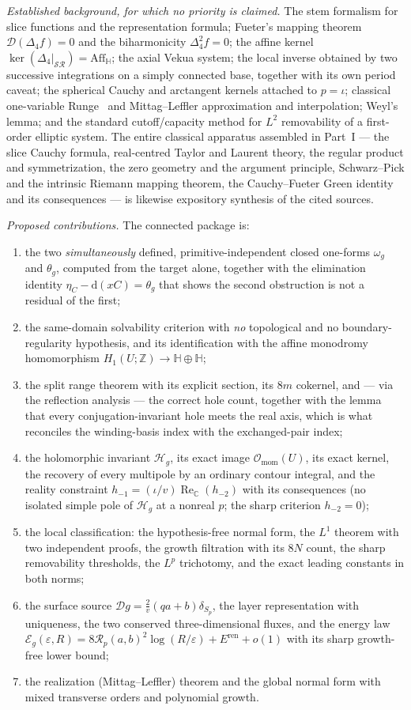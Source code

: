 \documentclass[11pt,a4paper]{article}
\numberwithin{equation}{section}
\theoremstyle{definition}
\theoremstyle{remark}
\theoremstyle{plain}
\newcommand{\HH}{\mathbb H}
\newcommand{\CC}{\mathbb C}
\newcommand{\ZZ}{\mathbb Z}
\DeclareMathOperator{\Rea}{Re}
\newcommand{\ReC}{\Rea_{\CC}}
\newcommand{\Dop}{\mathcal D}
\newcommand{\lap}{\Delta_4}
\newcommand{\SR}{\mathcal{SR}}
\newcommand{\Aff}{\mathrm{Aff}_{\HH}}
\newcommand{\Omom}{\mathcal O_{\mathrm{mom}}}
\newcommand{\om}{\omega}
\newcommand{\thet}{\theta}
\newcommand{\etaC}{\eta_{C}}
\newcommand{\pot}{C}          %
\newcommand{\Sp}{S_{p}}
\newcommand{\Rp}{\mathcal R_{p}}      %
\newcommand{\Hg}{\mathcal H_{g}}      %
\newcommand{\Eg}{\mathcal E_{g}}
\newcommand{\Eren}{E^{\mathrm{ren}}}
\newcommand{\dd}{\mathrm d}
\begin{document}
\emph{Established background, for which no priority is claimed.}
The stem formalism for slice functions and the representation formula;
Fueter's mapping theorem $\Dop(\lap f)=0$ and the biharmonicity
$\lap^2f=0$; the affine kernel $\ker(\lap|_{\SR})=\Aff$; the axial Vekua
system; the local inverse obtained by two successive integrations on a
simply connected base, together with its own period caveat; the spherical
Cauchy and arctangent kernels attached to $p=\iota$; classical one-variable
Runge~\cite{Runge} and Mittag--Leffler approximation and interpolation; Weyl's lemma;
and the standard cutoff/capacity method for $L^2$ removability of a
first-order elliptic system. The entire classical apparatus assembled in
Part~I --- the slice Cauchy formula, real-centred Taylor and Laurent
theory, the regular product and symmetrization, the zero geometry and the
argument principle, Schwarz--Pick and the intrinsic Riemann mapping
theorem, the Cauchy--Fueter Green identity and its consequences --- is
likewise expository synthesis of the cited sources.

\emph{Proposed contributions.} The connected package is:
\begin{enumerate}[label=\textup{(\alph*)}]
\item the two \emph{simultaneously} defined, primitive-independent closed
one-forms $\om_g$ and $\thet_g$, computed from the target alone, together
with the elimination identity $\etaC-\dd(x\pot)=\thet_g$ that shows the
second obstruction is not a residual of the first;
\item the same-domain solvability criterion with \emph{no} topological and
no boundary-regularity hypothesis, and its identification with the affine
monodromy homomorphism $H_1(U;\ZZ)\to\HH\oplus\HH$;
\item the split range theorem with its explicit section, its
$8m$ cokernel, and --- via the reflection analysis --- the correct hole
count, together with the lemma that every conjugation-invariant hole meets
the real axis, which is what reconciles the winding-basis index with the
exchanged-pair index;
\item the holomorphic invariant $\Hg$, its exact image $\Omom(U)$, its
exact kernel, the recovery of every multipole by an ordinary contour
integral, and the reality constraint
$h_{-1}=(\iota/v)\ReC(h_{-2})$ with its consequences (no isolated simple
pole of $\Hg$ at a nonreal $p$; the sharp criterion $h_{-2}=0$);
\item the local classification: the hypothesis-free normal form, the $L^1$
theorem with two independent proofs, the growth filtration with its $8N$
count, the sharp removability thresholds, the $L^p$ trichotomy, and the
exact leading constants in both norms;
\item the surface source $\Dop g=\frac2v(qa+b)\delta_{\Sp}$, the layer
representation with uniqueness, the two conserved three-dimensional fluxes,
and the energy law $\Eg(\varepsilon,R)=8\Rp(a,b)^2\log(R/\varepsilon)
+\Eren+o(1)$ with its sharp growth-free lower bound;
\item the realization (Mittag--Leffler) theorem and the global normal form
with mixed transverse orders and polynomial growth.
\end{enumerate}
\end{document}
